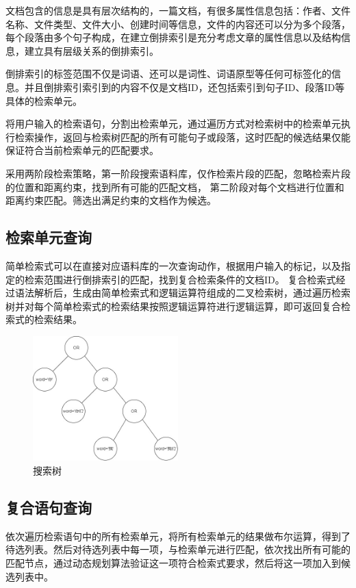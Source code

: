 \documentclass[11pt]{article}
\begin{document}
\begin{CJK*}{UTF8}{gbsn}
文档包含的信息是具有层次结构的，一篇文档，有很多属性信息包括：作者、文件名称、文件类型、文件大小、创建时间等信息，文件的内容还可以分为多个段落，每个段落由多个句子构成，在建立倒排索引是充分考虑文章的属性信息以及结构信息，建立具有层级关系的倒排索引。

倒排索引的标签范围不仅是词语、还可以是词性、词语原型等任何可标签化的信息。并且倒排索引索引到的内容不仅是文档ID，还包括索引到句子ID、段落ID等具体的检索单元。


将用户输入的检索语句，分割出检索单元，通过遍历方式对检索树中的检索单元执行检索操作，返回与检索树匹配的所有可能句子或段落，这时匹配的候选结果仅能保证符合当前检索单元的匹配要求。

采用两阶段检索策略，第一阶段搜索语料库，仅作检索片段的匹配，忽略检索片段的位置和距离约束，找到所有可能的匹配文档， 第二阶段对每个文档进行位置和距离约束匹配。筛选出满足约束的文档作为候选。

\subsection{检索单元查询}

简单检索式可以在直接对应语料库的一次查询动作，根据用户输入的标记，以及指定的检索范围进行倒排索引的匹配，找到复合检索条件的文档ID。
复合检索式经过语法解析后，生成由简单检索式和逻辑运算符组成的二叉检索树，通过遍历检索树并对每个简单检索式的检索结果按照逻辑运算符进行逻辑运算，即可返回复合检索式的检索结果。

\begin{figure}[h]
	\centering
	\includegraphics[width=0.5\textwidth]{node-tree.jpg}
	\caption{搜索树}
\end{figure}


\subsection{复合语句查询}

依次遍历检索语句中的所有检索单元，将所有检索单元的结果做布尔运算，得到了待选列表。然后对待选列表中每一项，与检索单元进行匹配，依次找出所有可能的匹配节点，通过动态规划算法验证这一项符合检索式要求，然后将这一项加入到候选列表中。


\end{CJK*}
\end{document}

